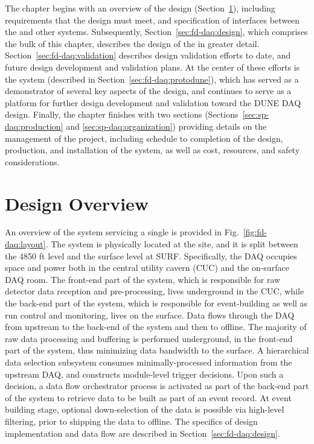 The chapter begins with an overview of the  design (Section~\ref{sec:fd-daq:overview}),
including requirements that the design must meet, and specification of
interfaces between the   and other   systems. 
Subsequently, Section~\ref{sec:fd-daq:design}, which comprises the
bulk of this chapter, describes the design of the 
 in greater detail.
Section~\ref{sec:fd-daq:validation} describes design validation efforts
to date, and future design development and validation plans. At the
center of these efforts is the 
  system (described in Section~\ref{sec:fd-daq:protodune}), which has served as a demonstrator of several
key aspects of the      design, and continues to serve as a
platform for further design development and validation toward the
DUNE DAQ design. 
Finally, the chapter finishes with two sections
(Sections~\ref{sec:sp-daq:production} and \ref{sec:sp-daq:organization}) providing details on
the management of the
 project, including schedule to completion of the design, 
production, and installation of the system, as well as cost, resources, and
safety considerations.

\section{Design Overview}
\label{sec:fd-daq:overview}

An overview of the    system 
servicing a single 
 is
provided in Fig.~\ref{fig:fd-daq:layout}. The system is
physically located at the  site, and it is split between the
4850 ft level and the surface level at SURF. Specifically, the DAQ occupies space and
power both in the central utility cavern (CUC) and the on-surface DAQ
room.  The front-end part of the system, which is responsible for
raw detector data reception and pre-processing, lives
underground in the CUC, while the back-end part of the system, which is responsible for
event-building as well as run control and monitoring, lives on the
surface. Data flows through the DAQ from 
upstream to the back-end of the system and then to offline. The majority
of raw data processing and buffering is performed underground, in the
front-end part of the system, thus minimizing data bandwidth to the surface. A
hierarchical data selection subsystem consumes minimally-processed
information from the upstream DAQ, and
constructs module-level trigger decisions. Upon such a decision, a data
flow orchestrator process is activated as part of the back-end part of
the system
to retrieve data to be built as part of an event record. At event
building stage, optional down-selection of the data is possible via
high-level filtering, prior to shipping the data to offline.  The
specifics of design implementation and data flow are described in Section~\ref{sec:fd-daq:design}.

